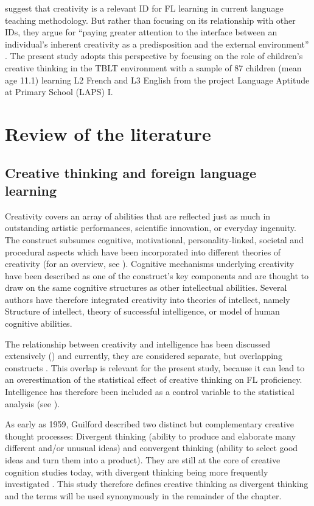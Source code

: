 \documentclass[output=paper]{langsci/langscibook}
\begin{document}
\citet{DoernyeiRyan2015} suggest that creativity is a relevant ID for FL learning in current language teaching methodology. But rather than focusing on its relationship with other IDs, they argue for “paying greater attention to the interface between an individual’s inherent creativity as a predisposition and the external environment” \citep[175]{DoernyeiRyan2015}. The present study adopts this perspective by focusing on the role of children’s creative thinking in the TBLT environment with a sample of 87 children (mean age 11.1) learning L2 French and L3 English from the project Language Aptitude at Primary School (LAPS) I.

\section{Review of the literature}\largerpage
\subsection{Creative thinking and foreign language learning}\label{sec:06:2.1}

Creativity covers an array of abilities that are reflected just as much in outstanding artistic performances, scientific innovation, or everyday ingenuity. The construct subsumes cognitive, motivational, personality-linked, societal and procedural aspects which have been incorporated into different theories of creativity (for an overview, see \citealt{Lubart1994}). Cognitive mechanisms underlying creativity have been described as one of the construct’s key components \citep{Lubart1994} and are thought to draw on the same cognitive structures as other intellectual abilities. Several authors have therefore integrated creativity into theories of intellect, namely  Structure of intellect,  theory of successful intelligence, or  model of human cognitive abilities.

The relationship between creativity and intelligence has been discussed extensively (\citealt{SternbergOHara1999}) and currently, they are considered separate, but overlapping constructs \citep{Vogt2010}. This overlap is relevant for the present study, because it can lead to an overestimation of the statistical effect of creative thinking on FL proficiency. Intelligence has therefore been included as a control variable to the statistical analysis (see ).

As early as 1959, Guilford described two distinct but complementary creative thought processes: Divergent thinking (ability to produce and elaborate many different and/or unusual ideas) and convergent thinking (ability to select good ideas and turn them into a product). They are still at the core of creative cognition studies today, with divergent thinking being more frequently investigated \citep{Cropley2006}. This study therefore defines creative thinking as divergent thinking and the terms will be used synonymously in the remainder of the chapter.
\end{document}
